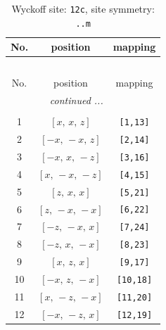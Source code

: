 \documentclass[fleqn,8pt]{jsarticle}
\begin{document}
\begin{longtable}{ccc}
\caption{Wyckoff site: {\tt 12c}, site symmetry: {\tt ..m}}
 \\
 \hline \hline
No. & position & mapping \\ \hline \endfirsthead

\multicolumn{2}{l}{\tablename\ \thetable{}} \\
 \hline \hline
No. & position & mapping \\ \hline \endhead

 \hline \hline
\multicolumn{2}{r}{\footnotesize\it continued ...} \\ \endfoot

 \hline \hline
\multicolumn{2}{r}{} \\ \endlastfoot

1 & $\left[ x,\, x,\, z \right]$ & {\tt [1,13]} \\ \hline
2 & $\left[ - x,\, - x,\, z \right]$ & {\tt [2,14]} \\ \hline
3 & $\left[ - x,\, x,\, - z \right]$ & {\tt [3,16]} \\ \hline
4 & $\left[ x,\, - x,\, - z \right]$ & {\tt [4,15]} \\ \hline
5 & $\left[ z,\, x,\, x \right]$ & {\tt [5,21]} \\ \hline
6 & $\left[ z,\, - x,\, - x \right]$ & {\tt [6,22]} \\ \hline
7 & $\left[ - z,\, - x,\, x \right]$ & {\tt [7,24]} \\ \hline
8 & $\left[ - z,\, x,\, - x \right]$ & {\tt [8,23]} \\ \hline
9 & $\left[ x,\, z,\, x \right]$ & {\tt [9,17]} \\ \hline
10 & $\left[ - x,\, z,\, - x \right]$ & {\tt [10,18]} \\ \hline
11 & $\left[ x,\, - z,\, - x \right]$ & {\tt [11,20]} \\ \hline
12 & $\left[ - x,\, - z,\, x \right]$ & {\tt [12,19]} \\
\end{longtable}
\renewcommand{\arraystretch}{1.2}
\end{document}
